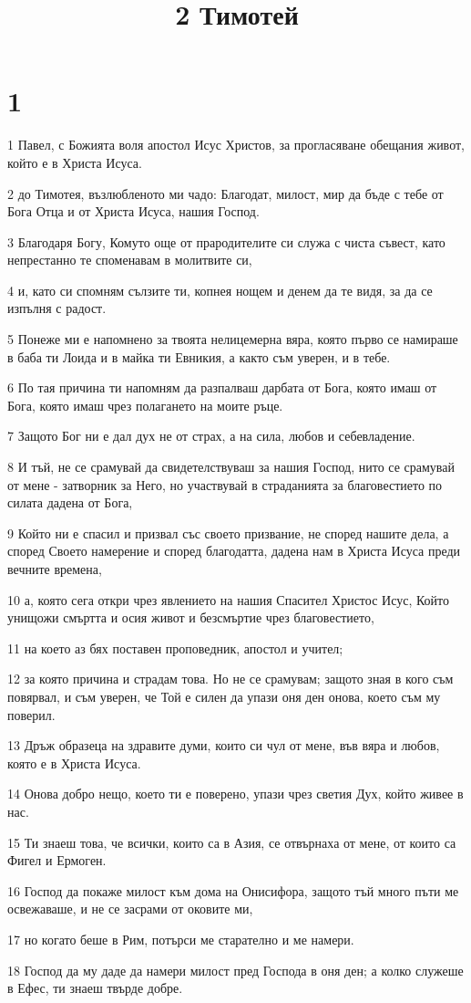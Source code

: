 

\title{2 Тимотей}


\chapter{1}

\par 1 Павел, с Божията воля апостол Исус Христов, за прогласяване обещания живот, който е в Христа Исуса.
\par 2 до Тимотея, възлюбленото ми чадо: Благодат, милост, мир да бъде с тебе от Бога Отца и от Христа Исуса, нашия Господ.
\par 3 Благодаря Богу, Комуто още от прародителите си служа с чиста съвест, като непрестанно те споменавам в молитвите си,
\par 4 и, като си спомням сълзите ти, копнея нощем и денем да те видя, за да се изпълня с радост.
\par 5 Понеже ми е напомнено за твоята нелицемерна вяра, която първо се намираше в баба ти Лоида и в майка ти Евникия, а както съм уверен, и в тебе.
\par 6 По тая причина ти напомням да разпалваш дарбата от Бога, която имаш от Бога, която имаш чрез полагането на моите ръце.
\par 7 Защото Бог ни е дал дух не от страх, а на сила, любов и себевладение.
\par 8 И тъй, не се срамувай да свидетелствуваш за нашия Господ, нито се срамувай от мене - затворник за Него, но участвувай в страданията за благовестието по силата дадена от Бога,
\par 9 Който ни е спасил и призвал със своето призвание, не според нашите дела, а според Своето намерение и според благодатта, дадена нам в Христа Исуса преди вечните времена,
\par 10 а, която сега откри чрез явлението на нашия Спасител Христос Исус, Който унищожи смъртта и осия живот и безсмъртие чрез благовестието,
\par 11 на което аз бях поставен проповедник, апостол и учител;
\par 12 за която причина и страдам това. Но не се срамувам; защото зная в кого съм повярвал, и съм уверен, че Той е силен да упази оня ден онова, което съм му поверил.
\par 13 Дръж образеца на здравите думи, които си чул от мене, във вяра и любов, която е в Христа Исуса.
\par 14 Онова добро нещо, което ти е поверено, упази чрез светия Дух, който живее в нас.
\par 15 Ти знаеш това, че всички, които са в Азия, се отвърнаха от мене, от които са Фигел и Ермоген.
\par 16 Господ да покаже милост към дома на Онисифора, защото тъй много пъти ме освежаваше, и не се засрами от оковите ми,
\par 17 но когато беше в Рим, потърси ме старателно и ме намери.
\par 18 Господ да му даде да намери милост пред Господа в оня ден; а колко служеше в Ефес, ти знаеш твърде добре.

